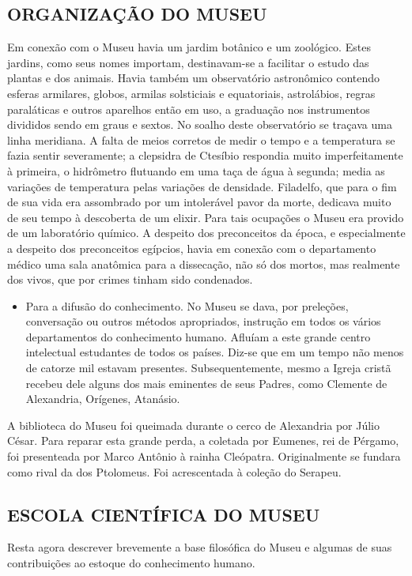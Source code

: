 \documentclass[11pt,a5paper,twoside,openany]{book}
\begin{document}
\subsection*{ORGANIZAÇÃO DO MUSEU}
Em conexão com o Museu havia um jardim botânico e um zoológico. Estes jardins, como seus nomes importam, destinavam-se a facilitar o estudo das plantas e dos animais. Havia também um observatório astronômico contendo esferas armilares, globos, armilas solsticiais e equatoriais, astrolábios, regras paraláticas e outros aparelhos então em uso, a graduação nos instrumentos divididos sendo em graus e sextos. No soalho deste observatório se traçava uma linha meridiana. A falta de meios corretos de medir o tempo e a temperatura se fazia sentir severamente; a clepsidra de Ctesíbio respondia muito imperfeitamente à primeira, o hidrômetro flutuando em uma taça de água à segunda; media as variações de temperatura pelas variações de densidade. Filadelfo, que para o fim de sua vida era assombrado por um intolerável pavor da morte, dedicava muito de seu tempo à descoberta de um elixir. Para tais ocupações o Museu era provido de um laboratório químico. A despeito dos preconceitos da época, e especialmente a despeito dos preconceitos egípcios, havia em conexão com o departamento médico uma sala anatômica para a dissecação, não só dos mortos, mas realmente dos vivos, que por crimes tinham sido condenados.

\begin{itemize}
\item Para a difusão do conhecimento. No Museu se dava, por preleções, conversação ou outros métodos apropriados, instrução em todos os vários departamentos do conhecimento humano. Afluíam a este grande centro intelectual estudantes de todos os países. Diz-se que em um tempo não menos de catorze mil estavam presentes. Subsequentemente, mesmo a Igreja cristã recebeu dele alguns dos mais eminentes de seus Padres, como Clemente de Alexandria, Orígenes, Atanásio.
\end{itemize}
A biblioteca do Museu foi queimada durante o cerco de Alexandria por Júlio César. Para reparar esta grande perda, a coletada por Eumenes, rei de Pérgamo, foi presenteada por Marco Antônio à rainha Cleópatra. Originalmente se fundara como rival da dos Ptolomeus. Foi acrescentada à coleção do Serapeu.

\subsection*{ESCOLA CIENTÍFICA DO MUSEU}
Resta agora descrever brevemente a base filosófica do Museu e algumas de suas contribuições ao estoque do conhecimento humano.
\end{document}
